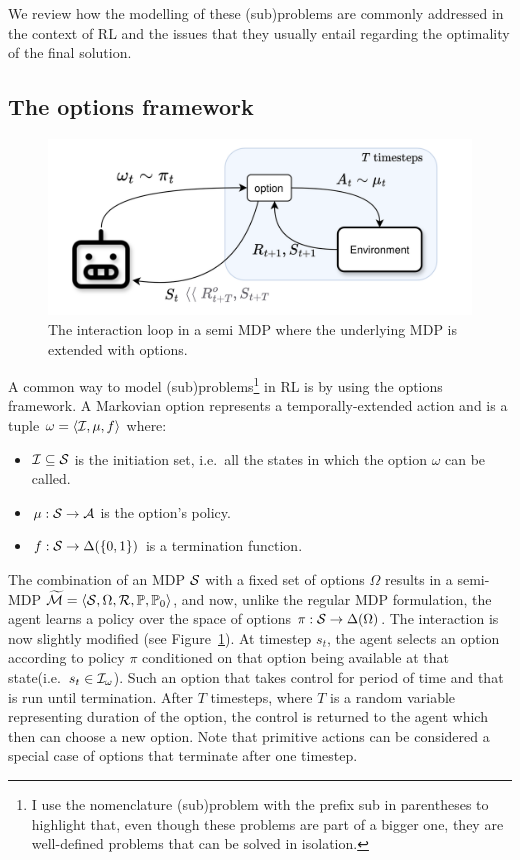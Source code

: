 We review how the modelling of these (sub)problems are commonly addressed in the context of RL and the issues that they usually entail regarding the optimality of the final solution.

\subsection{The options framework}

\begin{figure}
  \centering
  \includegraphics{figures/background/RL loop with Option.png}
  \caption{The interaction loop in a semi MDP where the underlying MDP is extended with options.}
  \label{fig:options}
\end{figure}

\label{section:options}
A common way to model (sub)problems\footnote{I use the nomenclature (sub)problem with the prefix sub in parentheses to highlight that, even though these problems are part of a bigger one, they are well-defined problems that can be solved in isolation.} in RL is by using the options framework. A Markovian option represents a temporally-extended action and is a tuple $\omega=\langle\mathcal{I}, \mu, f\rangle$ where:
\begin{itemize}
  \item $\mathcal{I}\subseteq\mathcal{S}$ is the initiation set, i.e.~all the states in which the option $\omega$ can be called.
  \item $\mu:\mathcal{S}\rightarrow\mathcal{A}$ is the option's policy.
  \item $f:\mathcal{S}\rightarrow\Delta(\{0, 1\})$ is a termination function.
\end{itemize}
The combination of an MDP $\mathcal{S}$ with a fixed set of options $\Omega$ results in a semi-MDP $\widetilde{\mathcal{M}}=\langle\mathcal{S},\Omega, \mathcal{R}, \mathbb{P}, \mathbb{P}_0\rangle$, and now, unlike the regular MDP formulation, the agent learns a policy over the space of options $\pi:\mathcal{S}\rightarrow\Delta(\Omega)$. The interaction is now slightly modified (see Figure~\ref{fig:options}). At timestep $s_t$, the agent selects an option according to policy $\pi$ conditioned on that option being available at that state(i.e.~$s_t\in\mathcal{I}_\omega$). Such an option that takes control for period of time and that is run until termination. After $T$ timesteps, where $T$ is a random variable representing duration of the option, the control is returned to the agent which then can choose a new option. Note that primitive actions can be considered a special case of options that terminate after one timestep.

